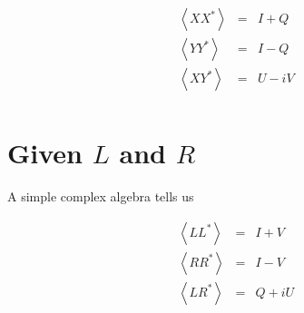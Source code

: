 \documentclass{article}
\begin{document}
\begin{eqnarray}
  \left<X X^*\right> &=& I+Q\\
  \left<Y Y^*\right> &=& I-Q\\
  \left<X Y^*\right> &=& U-iV\\
\end{eqnarray}

\section{Given $L$ and $R$}
A simple complex algebra tells us

\begin{eqnarray}
  \left<L L^*\right> &=& I+V\\
  \left<R R^*\right> &=& I-V\\
  \left<L R^*\right> &=& Q+iU\\
\end{eqnarray}
\end{document}
